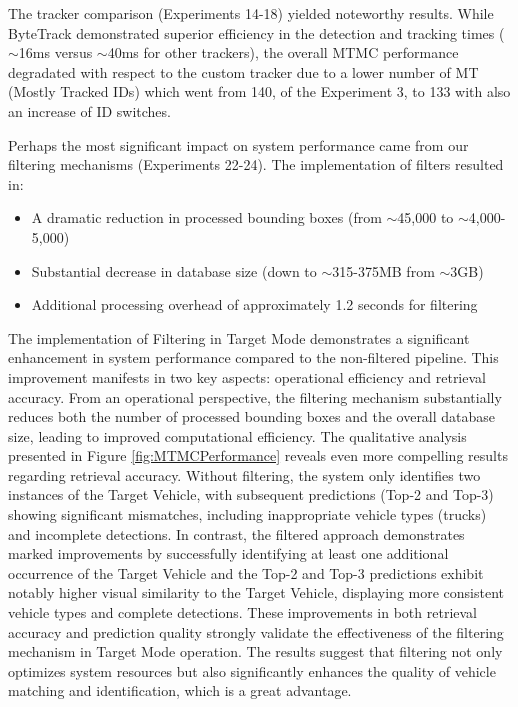 The tracker comparison (Experiments 14-18) yielded noteworthy results. While ByteTrack demonstrated superior efficiency in the detection and tracking times ($\sim$16ms versus $\sim$40ms for other trackers), the overall MTMC performance degradated with respect to the custom tracker due to a lower number of MT (Mostly Tracked IDs) which went from 140, of the Experiment 3, to 133 with also an increase of ID switches.

Perhaps the most significant impact on system performance came from our filtering mechanisms (Experiments 22-24). The implementation of filters resulted in:
\begin{itemize}
    \item A dramatic reduction in processed bounding boxes (from $\sim$45,000 to $\sim$4,000-5,000)
    \item Substantial decrease in database size (down to $\sim$315-375MB from $\sim$3GB)
    \item Additional processing overhead of approximately 1.2 seconds for filtering
\end{itemize}

The implementation of Filtering in Target Mode demonstrates a significant enhancement in system performance compared to the non-filtered pipeline. This improvement manifests in two key aspects: operational efficiency and retrieval accuracy. From an operational perspective, the filtering mechanism substantially reduces both the number of processed bounding boxes and the overall database size, leading to improved computational efficiency. The qualitative analysis presented in Figure \ref{fig:MTMCPerformance} reveals even more compelling results regarding retrieval accuracy. Without filtering, the system only identifies two instances of the Target Vehicle, with subsequent predictions (Top-2 and Top-3) showing significant mismatches, including inappropriate vehicle types (trucks) and incomplete detections. In contrast, the filtered approach demonstrates marked improvements by successfully identifying at least one additional occurrence of the Target Vehicle and the Top-2 and Top-3 predictions exhibit notably higher visual similarity to the Target Vehicle, displaying more consistent vehicle types and complete detections. These improvements in both retrieval accuracy and prediction quality strongly validate the effectiveness of the filtering mechanism in Target Mode operation. The results suggest that filtering not only optimizes system resources but also significantly enhances the quality of vehicle matching and identification, which is a great advantage.

